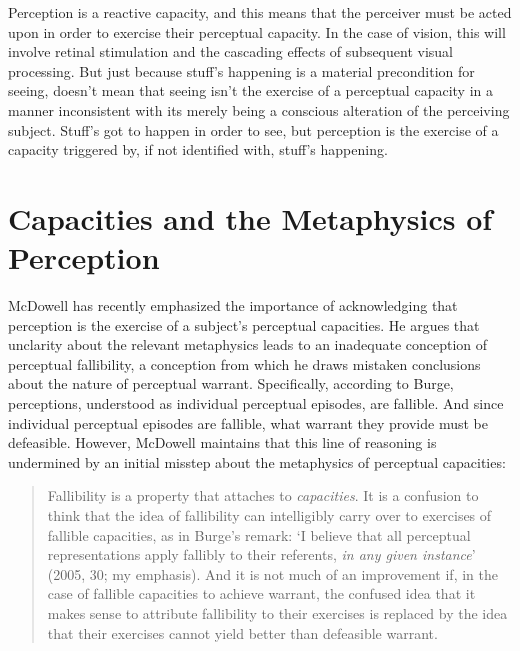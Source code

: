 \documentclass[12pt]{article}
\begin{document}
Perception is a reactive capacity, and this means that the perceiver must be acted upon in order to exercise their perceptual capacity. In the case of vision, this will involve retinal stimulation and the cascading effects of subsequent visual processing. But just because stuff's happening is a material precondition for seeing, doesn't mean that seeing isn't the exercise of a perceptual capacity in a manner inconsistent with its merely being a conscious alteration of the perceiving subject. Stuff's got to happen in order to see, but perception is the exercise of a capacity triggered by, if not identified with, stuff's happening.


\section{Capacities and the Metaphysics of Perception} %
\label{sec:capacities_and_the_metaphysics_of_perception}

McDowell has recently emphasized the importance of acknowledging that perception is the exercise of a subject's perceptual capacities. He argues that unclarity about the relevant metaphysics leads \citet{Burge:2005uq} to an inadequate conception of perceptual fallibility, a conception from which he draws mistaken conclusions about the nature of perceptual warrant. Specifically, according to Burge, perceptions, understood as individual perceptual episodes, are fallible. And since individual perceptual episodes are fallible, what warrant they provide must be defeasible. However, McDowell maintains that this line of reasoning is undermined by an initial misstep about the metaphysics of perceptual capacities:
\begin{quote}
	Fallibility is a property that attaches to \emph{capacities}. It is a confusion to think that the idea of fallibility can intelligibly carry over to exercises of fallible capacities, as in Burge’s remark: ‘I believe that all perceptual representations apply fallibly to their referents, \emph{in any given instance}’ (2005, 30; my emphasis). And it is not much of an improvement if, in the case of fallible capacities to achieve warrant, the confused idea that it makes sense to attribute fallibility to their exercises is replaced by the idea that their exercises cannot yield better than defeasible warrant.
\end{quote}

\end{document}
